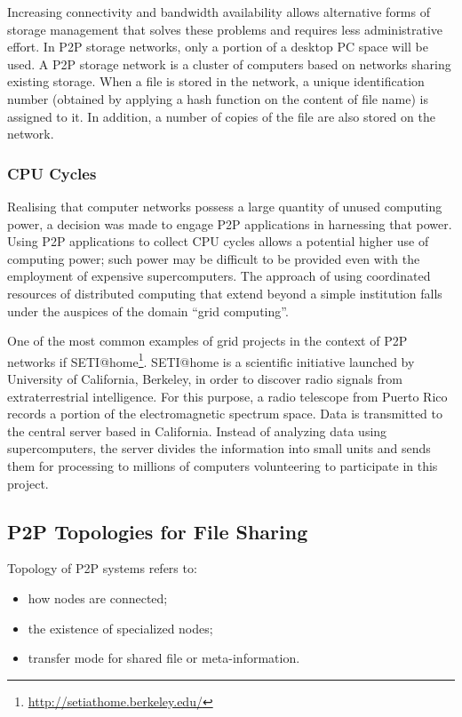 Increasing connectivity and bandwidth availability allows alternative forms of
storage management that solves these problems and requires less administrative
effort. In P2P storage networks, only a portion of a desktop PC space will be
used. A P2P storage network is a cluster of computers based on networks sharing
existing storage. When a file is stored in the network, a unique identification
number (obtained by applying a hash function on the content of file name) is
assigned to it. In addition, a number of copies of the file are also stored on
the network.

\subsubsection{CPU Cycles}

Realising that computer networks possess a large quantity of unused computing
power, a decision was made to engage P2P applications in harnessing that power.
Using P2P applications to collect CPU cycles allows a potential higher use
of computing power; such power may be difficult to be provided even with the
employment of expensive supercomputers. The approach of using coordinated
resources of distributed computing that extend beyond a simple institution
falls under the auspices of the domain ``grid computing''.

One of the most common examples of grid projects in the context of P2P networks
if SETI@home\footnote{\url{http://setiathome.berkeley.edu/}}. SETI@home is a scientific initiative launched by
University of California, Berkeley, in order to discover radio signals from
extraterrestrial intelligence. For this purpose, a radio telescope from Puerto
Rico records a portion of the electromagnetic spectrum space. Data is
transmitted to the central server based in California. Instead of analyzing
data using supercomputers, the server divides the information into small units
and sends them for processing to millions of computers volunteering to
participate in this project.

\subsection{P2P Topologies for File Sharing}

Topology of P2P systems refers to:
\begin{itemize}
  \item how nodes are connected;
  \item the existence of specialized nodes;
  \item transfer mode for shared file or meta-information.
\end{itemize}

